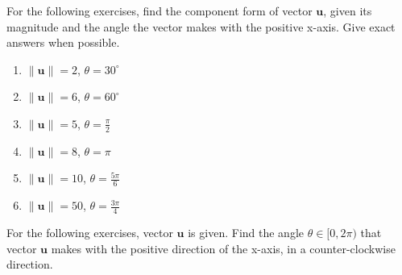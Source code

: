 \documentclass{exercises}
\begin{document}
For the following exercises, find the component form of vector $\mathbf{u}$, given its magnitude and the angle the vector makes with the positive x-axis. Give exact answers when possible.

\begin{enumerate}[resume]
\item $\|\mathbf{u}\|=2$, $\theta=30^\circ$
\item $\|\mathbf{u}\|=6$, $\theta=60^\circ$
\item $\|\mathbf{u}\|=5$, $\theta=\frac{\pi}{2}$
\item $\|\mathbf{u}\|=8$, $\theta=\pi$
\item $\|\mathbf{u}\|=10$, $\theta=\frac{5\pi}{6}$
\item $\|\mathbf{u}\|=50$, $\theta=\frac{3\pi}{4}$
\end{enumerate}

For the following exercises, vector $\mathbf{u}$ is given. Find the angle $\theta \in[0,2\pi)$ that vector $\mathbf{u}$ makes with the positive direction of the x-axis, in a counter-clockwise direction.
\end{document}
